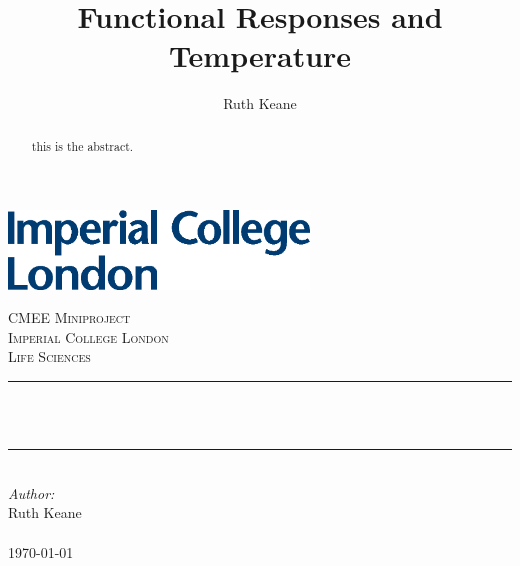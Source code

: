 \documentclass{article}
\title{Functional Responses and Temperature}%
\author{Ruth Keane}
\begin{document}
\begin{titlepage}

\newcommand{\HRule}{\rule{\linewidth}{0.5mm}} 
\includegraphics[width=8cm]{logo.eps}\\[1cm] 
\center 

\textsc{\LARGE CMEE Miniproject}\\[1.5cm] 
\textsc{\Large Imperial College London}\\[0.5cm]
\textsc{\large Life Sciences}\\[0.5cm] 

\makeatletter
\HRule \\[0.4cm]
{ \huge \bfseries \@title}\\[0.4cm] %
\HRule \\[1.5cm]
\makeatother
\Large \emph{Author:}\\
Ruth Keane \\[3cm] %
\\

{\large \today}\\[2cm] %

\vfill %

\end{titlepage}

\begin{abstract}
this is the abstract.

\end{abstract}
%
%
%
\end{document}

